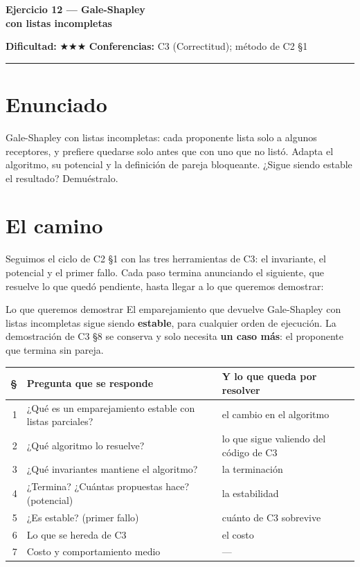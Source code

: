 \documentclass[11pt]{article}
\begin{document}
{\LARGE\bfseries\color{azultitulo} Ejercicio 12 --- Gale-Shapley\\ con listas incompletas}

\vspace{2pt}
\textbf{Dificultad:} $\bigstar\bigstar\bigstar$ \quad \textbf{Conferencias:} C3 (Correctitud);
método de C2 §1
\vspace{8pt}
\hrule
\vspace{12pt}

\section*{Enunciado}
\begin{enunciado}
Gale-Shapley con listas incompletas: cada proponente lista solo a algunos receptores, y prefiere quedarse
solo antes que con uno que no listó. Adapta el algoritmo, su potencial y la definición de pareja
bloqueante. ¿Sigue siendo estable el resultado? Demuéstralo.
\end{enunciado}

\section*{El camino}

Seguimos el ciclo de C2 §1 con las tres herramientas de C3: el invariante, el potencial y el primer fallo. Cada
paso termina anunciando el siguiente, que resuelve lo que quedó pendiente, hasta llegar a lo que queremos demostrar:

\begin{resultado}{Lo que queremos demostrar}
El emparejamiento que devuelve Gale-Shapley con listas incompletas sigue siendo \textbf{estable}, para cualquier
orden de ejecución. La demostración de C3 §8 se conserva y solo necesita \textbf{un caso más}: el proponente
que termina sin pareja.
\end{resultado}

\begin{center}\small
\begin{tabular}{@{}rll@{}}
\toprule
\textbf{§} & \textbf{Pregunta que se responde} & \textbf{Y lo que queda por resolver}\\
\midrule
1 & ¿Qué es un emparejamiento estable con listas parciales? & el cambio en el algoritmo\\
2 & ¿Qué algoritmo lo resuelve? & lo que sigue valiendo del código de C3\\
3 & ¿Qué invariantes mantiene el algoritmo? & la terminación\\
4 & ¿Termina? ¿Cuántas propuestas hace? (potencial) & la estabilidad\\
5 & ¿Es estable? (primer fallo) & cuánto de C3 sobrevive\\
6 & Lo que se hereda de C3 & el costo\\
7 & Costo y comportamiento medio & ---\\
\bottomrule
\end{tabular}
\end{center}
\end{document}
